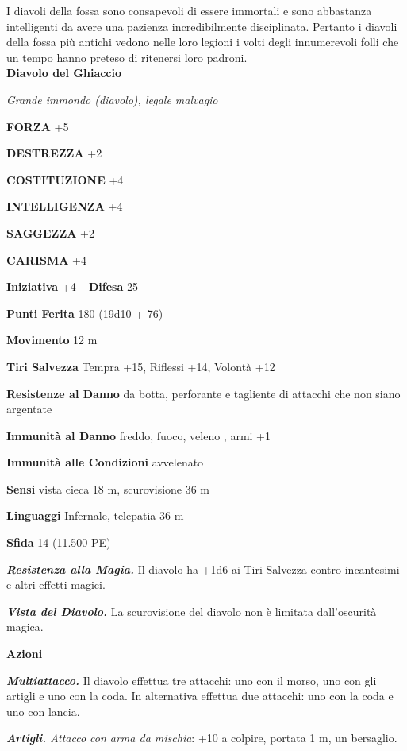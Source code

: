 \begin{multicols}{2}
I diavoli della fossa sono consapevoli di essere immortali e sono abbastanza intelligenti da avere una pazienza incredibilmente disciplinata. Pertanto i diavoli della fossa più antichi vedono nelle loro legioni i volti degli innumerevoli folli che un tempo hanno preteso di ritenersi loro padroni.\\


\medskip{}\textbf{Diavolo del Ghiaccio}

\emph{Grande immondo (diavolo), legale malvagio}

\textbf{FORZA} +5

\textbf{DESTREZZA} +2

\textbf{COSTITUZIONE} +4

\textbf{INTELLIGENZA} +4

\textbf{SAGGEZZA} +2

\textbf{CARISMA} +4

\textbf{Iniziativa} +4 -- \textbf{Difesa} 25

\textbf{Punti Ferita} 180 (19d10 + 76)

\textbf{Movimento} 12 m

\textbf{Tiri Salvezza} Tempra +15, Riflessi +14, Volontà +12

\textbf{Resistenze al Danno} da botta, perforante e tagliente di attacchi che non siano argentate

\textbf{Immunità al Danno} freddo, fuoco, veleno , armi +1

\textbf{Immunità alle Condizioni} avvelenato

\textbf{Sensi} vista cieca 18 m, scurovisione 36 m

\textbf{Linguaggi} Infernale, telepatia 36 m

\textbf{Sfida} 14 (11.500 PE)

\emph{\textbf{Resistenza alla Magia.}} Il diavolo ha +1d6 ai Tiri Salvezza contro incantesimi e altri effetti magici.

\emph{\textbf{Vista del Diavolo.}} La scurovisione del diavolo non è limitata dall'oscurità magica.

\textbf{Azioni}

\emph{\textbf{Multiattacco.}} Il diavolo effettua tre attacchi: uno con il morso, uno con gli artigli e uno con la coda. In alternativa effettua due attacchi: uno con la coda e uno con lancia.

\emph{\textbf{Artigli.} Attacco con arma da mischia}: +10 a colpire, portata 1 m, un bersaglio.


\end{multicols}
